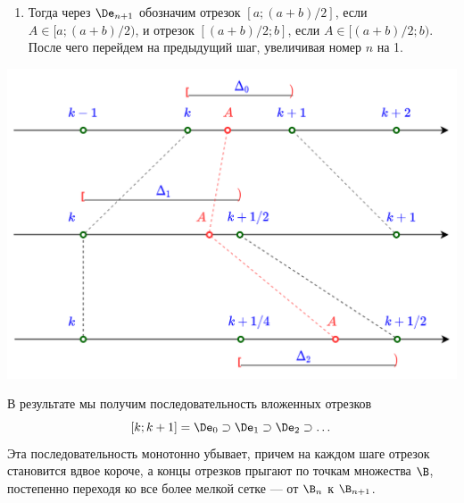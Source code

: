 \begin{enumerate}
\begin{enumerate}[{\bf Step1}]
Заметим, что и границы $\De_n$, и его середина --- это точки множества $\B$, причем границы $\De_n$ находятся в множестве $\B_n$, а его середина --- в множестве $\B_{n+1}$. Таким образом, это подразбиение является переходом к следующему уровню разбиения в множестве $\B$.
\item Тогда через $\De_{n+1}$ обозначим отрезок $[a;(a+b)/2]$, если $A\in[a;(a+b)/2)$, и отрезок $[(a+b)/2;b]$, если $A\in[(a+b)/2;b)$. После чего перейдем на предыдущий шаг, увеличивая номер $n$ на 1.
\end{enumerate}

\begin{center}
\includegraphics[scale=0.3]{Step1-3.png}
\end{center}

В результате мы получим последовательность вложенных отрезков
$$
[k;k+1]=\De_0\supset\De_1\supset\De_2\supset\dots
$$
Эта последовательность монотонно убывает, причем на каждом шаге отрезок становится вдвое короче, а концы отрезков прыгают по точкам множества $\B$, постепенно переходя ко все более мелкой сетке --- от $\B_n$ к $\B_{n+1}$.


\end{enumerate}
